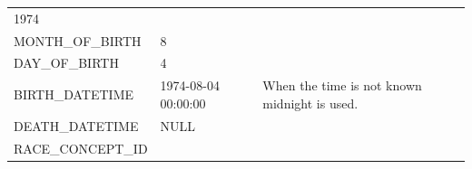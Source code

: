 \documentclass[11pt]{book}
\theoremstyle{definition}
\theoremstyle{definition}
\theoremstyle{definition}
\theoremstyle{remark}
\begin{document}
\begin{longtable}[]{@{}lll@{}}
\begin{minipage}[t]{0.16\columnwidth}
1974\strut
\end{minipage} & \begin{minipage}[t]{0.48\columnwidth}\raggedright\strut
\strut
\end{minipage}\tabularnewline
\begin{minipage}[t]{0.28\columnwidth}\raggedright\strut
MONTH\_OF\_BIRTH\strut
\end{minipage} & \begin{minipage}[t]{0.16\columnwidth}\raggedright\strut
8\strut
\end{minipage} & \begin{minipage}[t]{0.48\columnwidth}\raggedright\strut
\strut
\end{minipage}\tabularnewline
\begin{minipage}[t]{0.28\columnwidth}\raggedright\strut
DAY\_OF\_BIRTH\strut
\end{minipage} & \begin{minipage}[t]{0.16\columnwidth}\raggedright\strut
4\strut
\end{minipage} & \begin{minipage}[t]{0.48\columnwidth}\raggedright\strut
\strut
\end{minipage}\tabularnewline
\begin{minipage}[t]{0.28\columnwidth}\raggedright\strut
BIRTH\_DATETIME\strut
\end{minipage} & \begin{minipage}[t]{0.16\columnwidth}\raggedright\strut
1974-08-04 00:00:00\strut
\end{minipage} & \begin{minipage}[t]{0.48\columnwidth}\raggedright\strut
When the time is not known midnight is used.\strut
\end{minipage}\tabularnewline
\begin{minipage}[t]{0.28\columnwidth}\raggedright\strut
DEATH\_DATETIME\strut
\end{minipage} & \begin{minipage}[t]{0.16\columnwidth}\raggedright\strut
NULL\strut
\end{minipage} & \begin{minipage}[t]{0.48\columnwidth}\raggedright\strut
\strut
\end{minipage}\tabularnewline
\begin{minipage}[t]{0.28\columnwidth}\raggedright\strut
RACE\_CONCEPT\_ID\strut
\end{minipage} & \begin{minipage}[t]{0.16\columnwidth}\raggedright\strut

\end{minipage}
\end{longtable}
\end{document}
